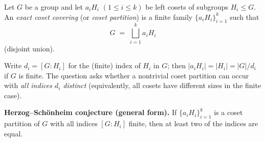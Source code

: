 Let $G$ be a group and let $a_iH_i$ $(1\le i\le k)$ be left cosets of subgroups $H_i\le G$.
An \emph{exact coset covering} (or \emph{coset partition}) is a finite family $\{a_iH_i\}_{i=1}^k$ such that
\[
G \;=\; \bigsqcup_{i=1}^k a_iH_i
\]
(disjoint union).

Write $d_i=[G:H_i]$ for the (finite) index of $H_i$ in $G$; then $|a_iH_i|=|H_i|=|G|/d_i$ if $G$ is finite.
The question asks whether a nontrivial coset partition can occur with \emph{all indices $d_i$ distinct} (equivalently, all cosets have different sizes in the finite case).

\medskip
\noindent\textbf{Herzog--Sch\"onheim conjecture (general form).}
If $\{a_iH_i\}_{i=1}^k$ is a coset partition of $G$ with all indices $[G:H_i]$ finite, then at least two of the indices are equal.

